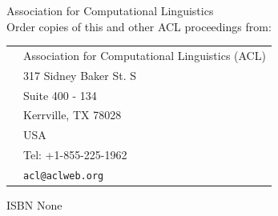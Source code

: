 \documentclass[11pt,oneside]{book}
\begin{document}
{}
\vspace*{11cm}
{\large

\noindent
{} Association for Computational Linguistics\\

\vspace*{2cm}
\noindent
Order copies of this and other ACL proceedings from:

\vspace*{1cm}
\begin{tabular}{p{1.5cm}l}
& Association for Computational Linguistics (ACL)\\
& 317 Sidney Baker St. S \\
& Suite 400 - 134\\
& Kerrville, TX 78028\\
& USA\\
& Tel: +1-855-225-1962\\
&{\tt acl@aclweb.org}\\
\end{tabular}

\vspace*{1cm}
ISBN None
}
\newpage
\end{document}
